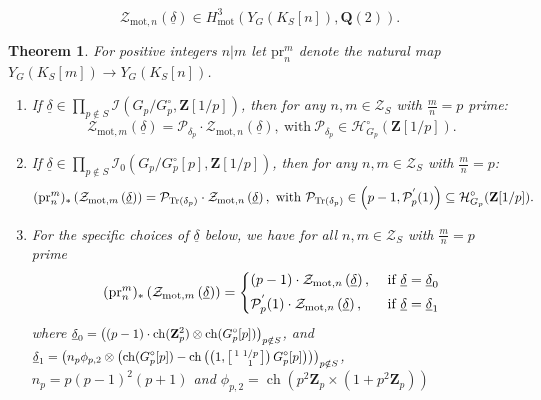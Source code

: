 \documentclass{amsart}%
\theoremstyle{plain}
\newtheorem{thm}{Theorem}[subsection]
\newcommand\scalemath[2]{\scalebox{#1}{\mbox{\ensuremath{\displaystyle #2}}}}
\theoremstyle{plain}
\theoremstyle{remark}
\DeclareMathOperator{\ch}{ch}
\begin{document}
$$\mathcal{Z}_{\mathrm{mot},n}(\underline{\delta})\in H^3_\mathrm{mot}(Y_G(K_S[n]),\mathbf{Q}(2)).$$
\begin{thm}\label{thm euler system norm relations}
     For positive integers $n|m$ let $\mathrm{pr}_n^m$ denote the natural map $Y_G(K_S[m])\rightarrow Y_G(K_S[n])$. 
    \begin{enumerate}
        \item If $\underline{\delta}\in\prod_{p\notin S}\mathcal{I}(G_p/G_p^\circ,\mathbf{Z}[1/p])$, then for any $n,m\in\mathscr{Z}_S$ with $\tfrac{m}{n}=p$ prime\emph{:}
        $$\mathcal{Z}_{\mathrm{mot},m}\left(\underline{\delta}\right)=\mathcal{P}_{\delta_p}\cdot \mathcal{Z}_{\mathrm{mot},n}\left(\underline{\delta}\right),\ \text{with}\ \mathcal{P}_{\delta_p}\in\mathcal{H}_{G_p}^\circ(\mathbf{Z}[1/p]).$$
        \item If $\underline{\delta}\in\prod_{p\notin S}\mathcal{I}_0(G_p/G_p^\circ[p],\mathbf{Z}[1/p])$, then for any $n,m\in\mathscr{Z}_S$ with $\tfrac{m}{n}=p$\emph{:}
        \begin{align}\label{eq: 25}\scalemath{1}{(\mathrm{pr}^{m}_n)_*\left(\mathcal{Z}_{\mathrm{mot},m}\left(\underline{\delta}\right)\right)=\mathcal{P}_{\mathrm{Tr}(\delta_p)}\cdot \mathcal{Z}_{\mathrm{mot},n}\left(\underline{\delta}\right),\ \text{with}\ \mathcal{P}_{\mathrm{Tr}(\delta_p)}\in\left(p-1,\mathcal{P}_p^{'}(1)\right)\subseteq\mathcal{H}_{G_p}^\circ(\mathbf{Z}[1/p]).}\end{align}
        \item 
        For the specific choices of $\underline{\delta}$ below, we have for all $n,m\in\mathscr{Z}_S$ with $\tfrac{m}{n}=p$ prime 
\begin{align*}
(\mathrm{pr}^{m}_n)_*\left(\mathcal{Z}_{\mathrm{mot},m}\left(\underline{\delta}\right)\right)=\begin{dcases}
        (p-1)\cdot \mathcal{Z}_{\mathrm{mot},n}\left(\underline{\delta}\right),\ &\text{if}\ \underline{\delta}=\underline{\delta}_0\\
        \mathcal{P}_p^{'}(1)\cdot \mathcal{Z}_{\mathrm{mot},n}\left(\underline{\delta}\right),\ &\text{if}\ \underline{\delta}=\underline{\delta}_1
    \end{dcases}
\end{align*}
where $\scalemath{0.9}{\underline{\delta}_0=\left((p-1)\cdot \ch(\mathbf{Z}_p^2)\otimes \ch(G_p^\circ[p])\right)_{p\notin S}}$, and
$\scalemath{0.9}{\underline{\delta}_1=\left(n_p\phi_{p,2}\otimes\left(\ch(G_p^\circ[p])- \ch\left(\left(1,\left[\begin{smallmatrix}
            1 & 1/p \\
            & 1
        \end{smallmatrix}\right]\right) G_p^\circ[p]\right)\right)\right)_{p\notin S}}$,\\ $n_p=p(p-1)^2(p+1)$ and $\phi_{p,2}=\ch(p^2\mathbf{Z}_p\times (1+p^2\mathbf{Z}_p))$
    \end{enumerate}
\end{thm}
\end{document}
